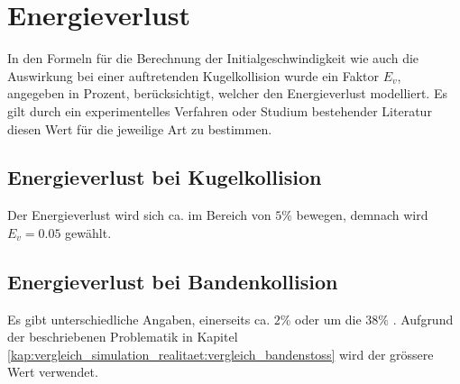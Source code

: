 \section{Energieverlust}
In den Formeln für die Berechnung der Initialgeschwindigkeit wie auch die Auswirkung bei einer auftretenden Kugelkollision
wurde ein Faktor $E_v$, angegeben in Prozent, berücksichtigt, welcher den Energieverlust modelliert.
Es gilt durch ein experimentelles Verfahren oder Studium bestehender Literatur diesen Wert für die jeweilige Art zu bestimmen.

\subsection{Energieverlust bei Kugelkollision}
Der Energieverlust wird sich ca. im Bereich von $5\%$ \cite{unikoblenz:entwicklungvirtuellesbillarspiel} bewegen, demnach wird $E_v = 0.05$ gewählt.

\subsection{Energieverlust bei Bandenkollision}
Es gibt unterschiedliche Angaben, einerseits ca. $2\%$ \cite{10.1243/09544062JMES1964} oder um die $38\%$ \cite{billardaktuell:thescienceofpocketbillards}.
Aufgrund der beschriebenen Problematik in Kapitel \ref{kap:vergleich_simulation_realitaet:vergleich_bandenstoss} wird
der grössere Wert verwendet.